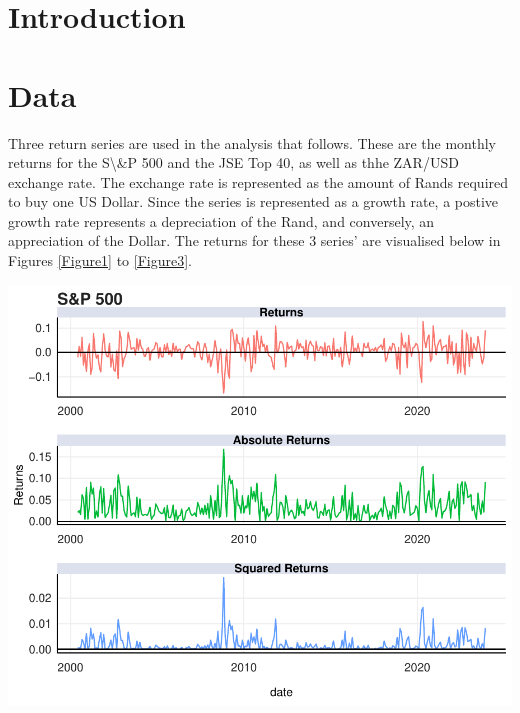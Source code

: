 \documentclass[11pt,preprint, authoryear]{elsarticle}
\let\origfigure\figure
\let\endorigfigure\endfigure
\renewenvironment{figure}[1][2] {
    \expandafter\origfigure\expandafter[H]
} {
    \endorigfigure
}
\numberwithin{equation}{section}
\numberwithin{figure}{section}
\numberwithin{table}{section}
\begin{document}
\headsep 35pt %




\hypertarget{introduction}{%
\section{\texorpdfstring{Introduction
\label{Introduction}}{Introduction }}\label{introduction}}

\hypertarget{data}{%
\section{Data}\label{data}}

Three return series are used in the analysis that follows. These are the
monthly returns for the S\textbackslash\&P 500 and the JSE Top 40, as
well as thhe ZAR/USD exchange rate. The exchange rate is represented as
the amount of Rands required to buy one US Dollar. Since the series is
represented as a growth rate, a postive growth rate represents a
depreciation of the Rand, and conversely, an appreciation of the Dollar.
The returns for these 3 series' are visualised below in Figures
\ref{Figure1} to \ref{Figure3}.

\begin{figure}[H]

{\centering \includegraphics{Template_files/figure-latex/Figure1-1} 

}

\caption{S\&P 500 Returns \label{Figure1}}\label{fig:Figure1}
\end{figure}
\end{document}
